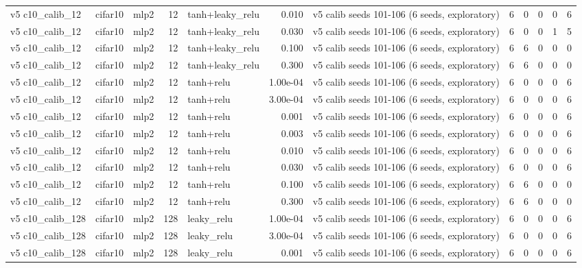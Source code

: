\begin{table}[htbp]
{\begin{tabular}{@{}lllrlrlrrrrr@{}}
v5 c10\_calib\_12 & cifar10 & mlp2 & 12 & tanh+leaky\_relu & 0.010 & v5 calib seeds 101-106 (6 seeds, exploratory) & 6 & 0 & 0 & 0 & 6 \\
v5 c10\_calib\_12 & cifar10 & mlp2 & 12 & tanh+leaky\_relu & 0.030 & v5 calib seeds 101-106 (6 seeds, exploratory) & 6 & 0 & 0 & 1 & 5 \\
v5 c10\_calib\_12 & cifar10 & mlp2 & 12 & tanh+leaky\_relu & 0.100 & v5 calib seeds 101-106 (6 seeds, exploratory) & 6 & 6 & 0 & 0 & 0 \\
v5 c10\_calib\_12 & cifar10 & mlp2 & 12 & tanh+leaky\_relu & 0.300 & v5 calib seeds 101-106 (6 seeds, exploratory) & 6 & 6 & 0 & 0 & 0 \\
v5 c10\_calib\_12 & cifar10 & mlp2 & 12 & tanh+relu & 1.00e-04 & v5 calib seeds 101-106 (6 seeds, exploratory) & 6 & 0 & 0 & 0 & 6 \\
v5 c10\_calib\_12 & cifar10 & mlp2 & 12 & tanh+relu & 3.00e-04 & v5 calib seeds 101-106 (6 seeds, exploratory) & 6 & 0 & 0 & 0 & 6 \\
v5 c10\_calib\_12 & cifar10 & mlp2 & 12 & tanh+relu & 0.001 & v5 calib seeds 101-106 (6 seeds, exploratory) & 6 & 0 & 0 & 0 & 6 \\
v5 c10\_calib\_12 & cifar10 & mlp2 & 12 & tanh+relu & 0.003 & v5 calib seeds 101-106 (6 seeds, exploratory) & 6 & 0 & 0 & 0 & 6 \\
v5 c10\_calib\_12 & cifar10 & mlp2 & 12 & tanh+relu & 0.010 & v5 calib seeds 101-106 (6 seeds, exploratory) & 6 & 0 & 0 & 0 & 6 \\
v5 c10\_calib\_12 & cifar10 & mlp2 & 12 & tanh+relu & 0.030 & v5 calib seeds 101-106 (6 seeds, exploratory) & 6 & 0 & 0 & 0 & 6 \\
v5 c10\_calib\_12 & cifar10 & mlp2 & 12 & tanh+relu & 0.100 & v5 calib seeds 101-106 (6 seeds, exploratory) & 6 & 6 & 0 & 0 & 0 \\
v5 c10\_calib\_12 & cifar10 & mlp2 & 12 & tanh+relu & 0.300 & v5 calib seeds 101-106 (6 seeds, exploratory) & 6 & 6 & 0 & 0 & 0 \\
v5 c10\_calib\_128 & cifar10 & mlp2 & 128 & leaky\_relu & 1.00e-04 & v5 calib seeds 101-106 (6 seeds, exploratory) & 6 & 0 & 0 & 0 & 6 \\
v5 c10\_calib\_128 & cifar10 & mlp2 & 128 & leaky\_relu & 3.00e-04 & v5 calib seeds 101-106 (6 seeds, exploratory) & 6 & 0 & 0 & 0 & 6 \\
v5 c10\_calib\_128 & cifar10 & mlp2 & 128 & leaky\_relu & 0.001 & v5 calib seeds 101-106 (6 seeds, exploratory) & 6 & 0 & 0 & 0 & 6 \\

\end{tabular}}
\end{table}
